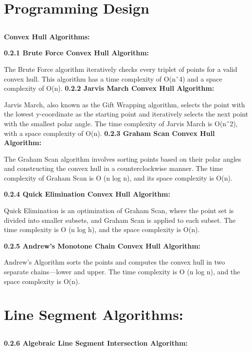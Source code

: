 \section{\textbf{Programming Design}}
\subsection{}
\textbf{Convex Hull Algorithms:}

\textbf{0.2.1 Brute Force Convex Hull Algorithm:}

The Brute Force algorithm iteratively checks every triplet of points for a valid convex hull. This algorithm has a time
complexity of O(nˆ4) and a space complexity of O(n).
\textbf{0.2.2 Jarvis March Convex Hull Algorithm:}

Jarvis March, also known as the Gift Wrapping algorithm, selects the point with the lowest y-coordinate as the starting
point and iteratively selects the next point with the smallest polar angle. The time complexity of Jarvis March is
O(nˆ2), with a space complexity of O(n).
\textbf{0.2.3 Graham Scan Convex Hull Algorithm:}

The Graham Scan algorithm involves sorting points based on their polar angles and constructing the convex hull in a
counterclockwise manner. The time complexity of Graham Scan is O (n log n), and its space complexity is O(n).

\textbf{0.2.4 Quick Elimination Convex Hull Algorithm:}

Quick Elimination is an optimization of Graham Scan, where the point set is divided into smaller subsets, and Graham
Scan is applied to each subset. The time complexity is O (n log h), and the space complexity is O(n).

\textbf{0.2.5 Andrew’s Monotone Chain Convex Hull Algorithm:}

Andrew’s Algorithm sorts the points and computes the convex hull in two separate chains—lower and upper. The time
complexity is O (n log n), and the space complexity is O(n).


\section{\textbf{Line Segment Algorithms:}}

\subsection{}

\textbf{0.2.6 Algebraic Line Segment Intersection Algorithm:}

